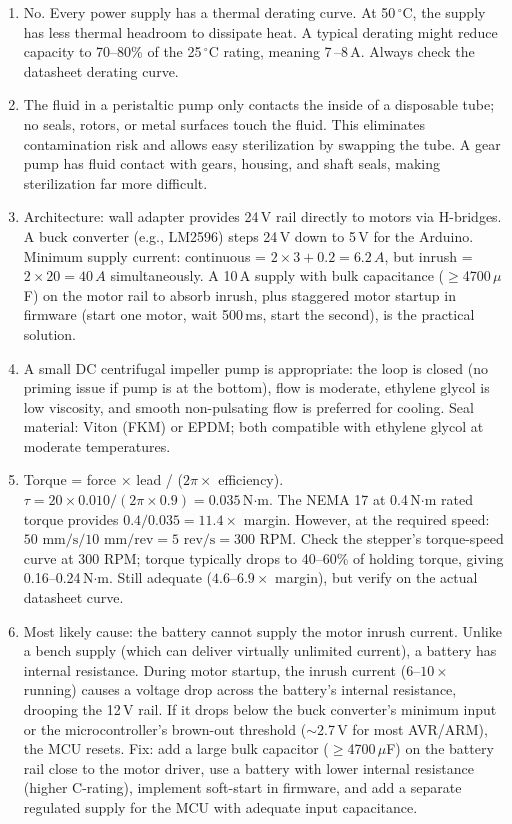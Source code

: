 \begin{enumerate}[leftmargin=1.5em]
  \item No. Every power supply has a thermal derating curve. At 50\,$^{\circ}$C, the supply has less thermal headroom to dissipate heat. A typical derating might reduce capacity to 70--80\% of the 25\,$^{\circ}$C rating, meaning 7\,--8\,A. Always check the datasheet derating curve.

  \item The fluid in a peristaltic pump only contacts the inside of a disposable tube; no seals, rotors, or metal surfaces touch the fluid. This eliminates contamination risk and allows easy sterilization by swapping the tube. A gear pump has fluid contact with gears, housing, and shaft seals, making sterilization far more difficult.

  \item Architecture: wall adapter provides 24\,V rail directly to motors via H-bridges. A buck converter (e.g., LM2596) steps 24\,V down to 5\,V for the Arduino. Minimum supply current: continuous = $2 \times 3 + 0.2 = 6.2\,A$, but inrush = $2 \times 20 = 40\,A$ simultaneously. A 10\,A supply with bulk capacitance ($\geq$4700\,$\mu$F) on the motor rail to absorb inrush, plus staggered motor startup in firmware (start one motor, wait 500\,ms, start the second), is the practical solution.

  \item A small DC centrifugal impeller pump is appropriate: the loop is closed (no priming issue if pump is at the bottom), flow is moderate, ethylene glycol is low viscosity, and smooth non-pulsating flow is preferred for cooling. Seal material: Viton (FKM) or EPDM; both compatible with ethylene glycol at moderate temperatures.

  \item Torque = force $\times$ lead / ($2\pi \times$ efficiency). $\tau = 20 \times 0.010 / (2\pi \times 0.9) = 0.035$\,N$\cdot$m. The NEMA 17 at 0.4\,N$\cdot$m rated torque provides $0.4 / 0.035 = 11.4\times$ margin. However, at the required speed: $50\text{ mm/s} / 10\text{ mm/rev} = 5\text{ rev/s} = 300\text{ RPM}$. Check the stepper's torque-speed curve at 300 RPM; torque typically drops to 40--60\% of holding torque, giving 0.16--0.24\,N$\cdot$m. Still adequate ($4.6$--$6.9\times$ margin), but verify on the actual datasheet curve.

  \item Most likely cause: the battery cannot supply the motor inrush current. Unlike a bench supply (which can deliver virtually unlimited current), a battery has internal resistance. During motor startup, the inrush current ($6$--$10\times$ running) causes a voltage drop across the battery's internal resistance, drooping the 12\,V rail. If it drops below the buck converter's minimum input or the microcontroller's brown-out threshold ($\sim$2.7\,V for most AVR/ARM), the MCU resets. Fix: add a large bulk capacitor ($\geq$4700\,$\mu$F) on the battery rail close to the motor driver, use a battery with lower internal resistance (higher C-rating), implement soft-start in firmware, and add a separate regulated supply for the MCU with adequate input capacitance.
\end{enumerate}



